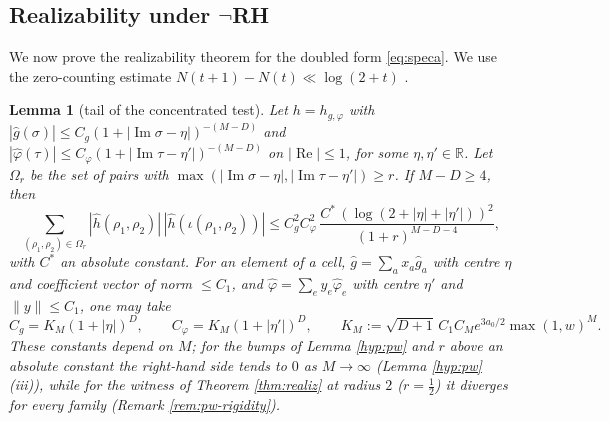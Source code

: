 \documentclass[11pt,reqno]{amsart}
\newtheorem{lemma}[theorem]{Lemma}
\theoremstyle{definition}
\newcommand{\R}{\mathbb{R}}
\newcommand{\half}{\tfrac12}
\begin{document}
\subsection{Realizability under \texorpdfstring{$\neg$}{not-}RH}
We now prove the realizability theorem for the doubled form \eqref{eq:speca}.
We use the zero-counting estimate \(N(t+1)-N(t)\ll\log(2+t)\)
\cite[Thm.~5.8]{IwaniecKowalski}.

\begin{lemma}[tail of the concentrated test]\label{lem:tail}
Let \(h=h_{g,\varphi}\) with \(|\hat g(\sigma)|\leq C_g(1+|\operatorname{Im}\sigma-
\eta|)^{-(M-D)}\) and \(|\hat\varphi(\tau)|\leq C_\varphi(1+|\operatorname{Im}
\tau-\eta'|)^{-(M-D)}\) on \(|\operatorname{Re}|\leq1\), for some
\(\eta,\eta'\in\R\). Let \(\Omega_r\) be the set of pairs with
\(\max(|\operatorname{Im}\sigma-\eta|,|\operatorname{Im}\tau-\eta'|)\geq r\).
If \(M-D\geq4\), then
\[
\sum_{(\rho_1,\rho_2)\in\Omega_r}|\hat h(\rho_1,\rho_2)|\,
|\hat h(\iota(\rho_1,\rho_2))|\leq
C_g^2C_\varphi^2\,\frac{C^*\,(\log(2+|\eta|+|\eta'|))^2}{(1+r)^{M-D-4}},
\]
with \(C^*\) an absolute constant. For an element of a cell,
\(\hat g=\sum_ax_a\hat g_a\) with centre \(\eta\) and coefficient vector of norm
\(\leq C_1\), and \(\hat\varphi=\sum_ey_e\hat\varphi_e\) with centre \(\eta'\)
and \(\|y\|\leq C_1\), one may take
\[
C_g=K_M(1+|\eta|)^D,\qquad C_\varphi=K_M(1+|\eta'|)^D,\qquad
K_M:=\sqrt{D+1}\,C_1C_Me^{3a_0/2}\max(1,w)^M .
\]
These constants depend on \(M\); for the bumps of Lemma \ref{hyp:pw} and
\(r\) above an absolute constant the right-hand side tends to \(0\) as
\(M\to\infty\) (Lemma \ref{hyp:pw}(iii)), while for the witness of Theorem \ref{thm:realiz} at radius \(2\) (\(r=\half\)) it diverges
for every family (Remark \ref{rem:pw-rigidity}).
\end{lemma}
\end{document}
